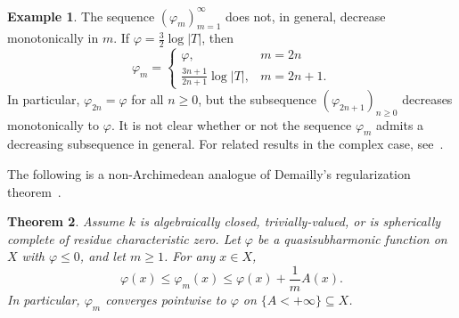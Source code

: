 \documentclass[10pt,reqno]{amsart}
\theoremstyle{plain}
\newtheorem{theorem}{Theorem}[section]
\theoremstyle{definition}
\newtheorem{example}[theorem]{Example}
\numberwithin{equation}{section}
\begin{document}
\begin{example}\label{example:not_decreasing}
The sequence $(\varphi_m)_{m = 1}^{\infty}$ does not, in general, decrease monotonically in $m$.
If $\varphi = \frac{3}{2} \log |T|$, then
$$
\varphi_m = \begin{cases}
\varphi, & m = 2n\\
\frac{3n+1}{2n+1} \log |T|, & m = 2n+1.
\end{cases}
$$
In particular, $\varphi_{2n} = \varphi$ for all $n \geq 0$, but the subsequence $(\varphi_{2n+1})_{n\geq 0}$ decreases monotonically to $\varphi$. 
It is not clear whether or not the sequence $\varphi_m$ admits a decreasing subsequence in general.
For related results in the complex case, see~\cite{dano-kim}.
\end{example}

The following 
is a non-Archimedean analogue of Demailly's regularization theorem~\cite[Proposition 3.1]{demailly92}.

\begin{theorem}\label{thm:convergence}
Assume $k$ is algebraically closed, trivially-valued, or is spherically complete of residue characteristic zero. 
Let $\varphi$ be a quasisubharmonic function on $X$ with $\varphi \leq 0$, and let $m \geq 1$. For any $x \in X$, 
$$
\varphi(x) \leq \varphi_m(x) \leq \varphi(x) + \frac{1}{m} A(x).
$$
In particular, $\varphi_m$ converges pointwise to $\varphi$ on $\{ A < +\infty \} \subseteq X$. 
\end{theorem}

\end{document}
